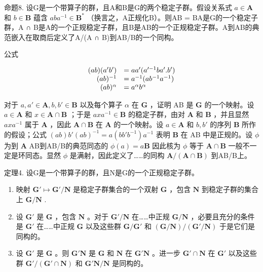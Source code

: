 命题8. 设G是一个带算子的群，且A和B是G的两个稳定子群。假设关系式 \(a \in \mathbf{A}\) 和 \(b \in \mathbf{B}\) 蕴含 \(aba^{-1} \in \mathbf{B}^*\) （换言之，A正规化B）。则AB = BA是G的一个稳定子群，A ∩ B是A的一个正规稳定子群，且B是AB的一个正规稳定子群。A到AB的典范嵌入在取商后定义了A/(A ∩ B)到AB/B的一个同构。

公式

\[
\begin{array}{r l} (a b) (a ^ {\prime} b ^ {\prime}) & = a a ^ {\prime} (a ^ {\prime - 1} b a ^ {\prime}. b ^ {\prime}) \\ (a b) ^ {- 1} & = a ^ {- 1} (a b ^ {- 1} a ^ {- 1}) \\ (a b) ^ {\alpha} & = a ^ {\alpha} b ^ {\alpha} \end{array}
\]

对于 \(a, a' \in \mathbf{A}, b, b' \in \mathbf{B}\) 以及每个算子 \(\alpha\) 在 \(\mathbf{G}\) ，证明 AB 是 \(\mathbf{G}\) 的一个映射。设 \(a \in \mathbf{A}\) 和 \(x \in \mathbf{A} \cap \mathbf{B}\) ；于是 \(axa^{-1} \in \mathbf{B}\) 的稳定子群，由对 \(\mathbf{A}\) 和 \(\mathbf{B}\) ，并且显然 \(axa^{-1}\) 属于 \(\mathbf{A}\) ，因此 \(\mathbf{A} \cap \mathbf{B}\) 在 \(\mathbf{A}\) 的一个映射。设 \(a \in \mathbf{A}\) 和 \(b, b'\) 的序列 \(\mathbf{B}\) 所作的假设；公式 \((ab)b'(ab)^{-1} = a(bb'b^{-1})a^{-1}\) 表明 \(\mathbf{B}\) 在 AB 中是正规的。设 \(\phi\) 为到 \(\mathbf{A}\) AB到AB/B的典范同态的 \(\phi(a) = a\mathbf{B}\) 因此核为 \(\phi\) 等于 \(\mathbf{A} \cap \mathbf{B}\) 一般不一定是环同态。显然 \(\phi\) 是满射，因此定义了……的同构 \(\mathbf{A}/(\mathbf{A} \cap \mathbf{B})\) 到AB/B上。

定理4. 设G是一个带算子的群，且N是G的一个正规稳定子群。

\begin{enumerate}
\def\labelenumi{(\alph{enumi})}
\item
  映射 \(\mathbf{G}' \mapsto \mathbf{G}' / \mathbf{N}\) 是稳定子群集合的一个双射 \(\mathbf{G}\) ，包含 \(\mathbf{N}\) 到稳定子群的集合上 \(\mathbf{G} / \mathbf{N}\) .
\item
  设 \(\mathbf{G}'\) 是 \(\mathbf{G}\) ，包含 \(\mathbf{N}\) 。对于 \(\mathbf{G}' / \mathbf{N}\) 在……中正规 \(\mathbf{G} / \mathbf{N}\) ，必要且充分的条件是 \(\mathbf{G}'\) 在……中正规 \(\mathbf{G}\) 以及这些群 \(\mathbf{G} / \mathbf{G}'\) 和 \((\mathbf{G} / \mathbf{N}) / (\mathbf{G}' / \mathbf{N})\) 于是它们是同构的。
\item
  设 \(\mathbf{G}'\) 是 \(\mathbf{G}\) 。则 \(\mathbf{G}'\mathbf{N}\) 是 \(\mathbf{G}\) 和 \(\mathbf{N}\) 在 \(\mathbf{G}'\mathbf{N}\) 。进一步 \(\mathbf{G}' \cap \mathbf{N}\) 在 \(\mathbf{G}'\) 以及这些群 \(\mathbf{G}' / (\mathbf{G}' \cap \mathbf{N})\) 和 \(\mathbf{G}'\mathbf{N} / \mathbf{N}\) 是同构的。
\end{enumerate}


